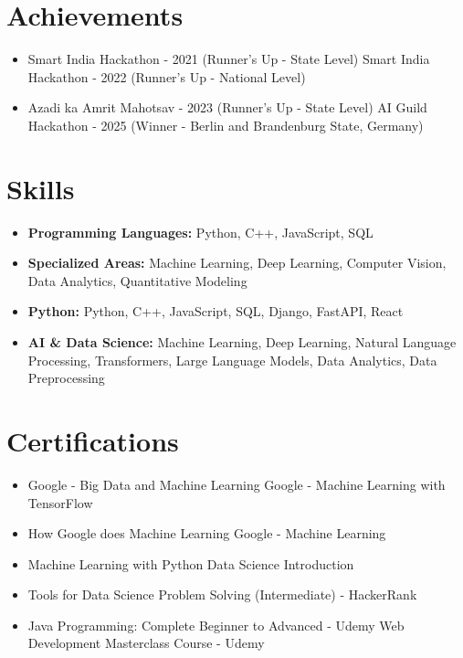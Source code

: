 \documentclass[a4paper,10pt]{article}
\begin{document}
\section*{Achievements}
\begin{itemize}
\item Smart India Hackathon - 2021 (Runner's Up - State Level) \hfill Smart India Hackathon - 2022 (Runner's Up - National Level)
\item Azadi ka Amrit Mahotsav - 2023 (Runner's Up - State Level) \hfill AI Guild Hackathon - 2025 (Winner - Berlin and Brandenburg State, Germany)
\end{itemize}

\section*{Skills}
\begin{itemize}
  \item \textbf{Programming Languages:} Python, C++, JavaScript, SQL
  \item \textbf{Specialized Areas:} Machine Learning, Deep Learning, Computer Vision, Data Analytics, Quantitative Modeling
  \item \textbf{Python:} Python, C++, JavaScript, SQL, Django, FastAPI, React
  \item \textbf{AI \& Data Science:} Machine Learning, Deep Learning, Natural Language Processing, Transformers, Large Language Models, Data Analytics, Data Preprocessing
\end{itemize}

\section*{Certifications}
\begin{itemize}
\item Google - Big Data and Machine Learning \hfill Google - Machine Learning with TensorFlow
\item How Google does Machine Learning \hfill Google - Machine Learning
\item Machine Learning with Python \hfill Data Science Introduction
\item Tools for Data Science \hfill Problem Solving (Intermediate) - HackerRank
\item Java Programming: Complete Beginner to Advanced - Udemy \hfill Web Development Masterclass Course - Udemy
\end{itemize}
\end{document}
